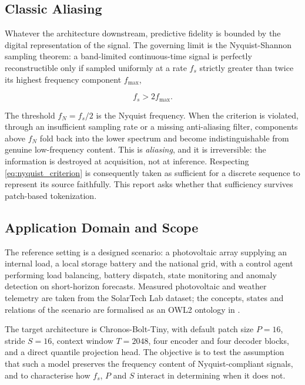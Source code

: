\subsection{Classic Aliasing}
Whatever the architecture downstream, predictive fidelity is bounded by the digital representation of the signal. The governing limit is the Nyquist-Shannon sampling theorem\autocite{shannonCommunicationPresenceNoise1949}: a band-limited continuous-time signal is perfectly reconstructible only if sampled uniformly at a rate $f_s$ strictly greater than twice its highest frequency component $f_{\max}$,

\begin{equation}
\label{eq:nyquist_criterion}
f_s > 2f_{\max}.
\end{equation}

The threshold $f_N = f_s/2$ is the Nyquist frequency. When the criterion is violated, through an insufficient sampling rate or a missing anti-aliasing filter, components above $f_N$ fold back into the lower spectrum and become indistinguishable from genuine low-frequency content\autocite{oppenheimDiscreteTimeSignalProcessing2010}. This is \textit{aliasing}, and it is irreversible: the information is destroyed at acquisition, not at inference. Respecting \autoref{eq:nyquist_criterion} is consequently taken as sufficient for a discrete sequence to represent its source faithfully. This report asks whether that sufficiency survives patch-based tokenization.

\subsection{Application Domain and Scope}
The reference setting is a designed scenario: a photovoltaic array supplying an internal load, a local storage battery and the national grid, with a control agent performing load balancing, battery dispatch, state monitoring and anomaly detection on short-horizon forecasts. Measured photovoltaic and weather telemetry are taken from the SolarTech Lab dataset\autocite{levaPhotovoltaicPowerWeather2020}; the concepts, states and relations of the scenario are formalised as an OWL2 ontology in .%

The target architecture is Chronos-Bolt-Tiny, with default patch size $P=16$, stride $S=16$, context window $T=2048$, four encoder and four decoder blocks, and a direct quantile projection head\autocite{AmazonChronosbolttinyHugging2025}. The objective is to test the assumption that such a model preserves the frequency content of Nyquist-compliant signals, and to characterise how $f_s$, $P$ and $S$ interact in determining when it does not\autocite{paganiPreliminaryInsightsChronos2026}.
